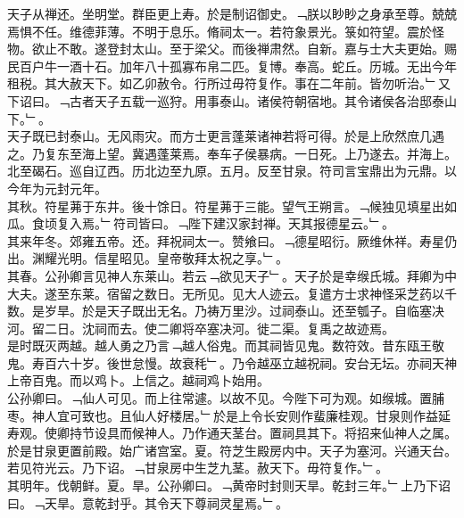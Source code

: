 \documentclass{zhvt-classic}
\begin{document}
\hspace*{2em}天子从禅还。坐明堂。群臣更上寿。於是制诏御史。﹁朕以眇眇之身承至尊。兢兢焉惧不任。维德菲薄。不明于息乐。脩祠太一。若符象景光。箓如符望。震於怪物。欲止不敢。遂登封太山。至于梁父。而後禅肃然。自新。嘉与士大夫更始。赐民百户牛一酒十石。加年八十孤寡布帛二匹。复博。奉高。蛇丘。历城。无出今年租税。其大赦天下。如乙卯赦令。行所过毋符复作。事在二年前。皆勿听治。﹂又下诏曰。﹁古者天子五载一巡狩。用事泰山。诸侯符朝宿地。其令诸侯各治邸泰山下。﹂。\\
\hspace*{2em}天子既已封泰山。无风雨灾。而方士更言蓬莱诸神若将可得。於是上欣然庶几遇之。乃复东至海上望。冀遇蓬莱焉。奉车子侯暴病。一日死。上乃遂去。并海上。北至碣石。巡自辽西。历北边至九原。五月。反至甘泉。符司言宝鼎出为元鼎。以今年为元封元年。\\
\hspace*{2em}其秋。符星茀于东井。後十馀日。符星茀于三能。望气王朔言。﹁候独见填星出如瓜。食顷复入焉。﹂符司皆曰。﹁陛下建汉家封禅。天其报德星云。﹂。\\
\hspace*{2em}其来年冬。郊雍五帝。还。拜祝祠太一。赞飨曰。﹁德星昭衍。厥维休祥。寿星仍出。渊耀光明。信星昭见。皇帝敬拜太祝之享。﹂。\\
\hspace*{2em}其春。公孙卿言见神人东莱山。若云﹁欲见天子﹂。天子於是幸缑氏城。拜卿为中大夫。遂至东莱。宿留之数日。无所见。见大人迹云。复遣方士求神怪采芝药以千数。是岁旱。於是天子既出无名。乃祷万里沙。过祠泰山。还至瓠子。自临塞决河。留二日。沈祠而去。使二卿将卒塞决河。徙二渠。复禹之故迹焉。\\
\hspace*{2em}是时既灭两越。越人勇之乃言﹁越人俗鬼。而其祠皆见鬼。数符效。昔东瓯王敬鬼。寿百六十岁。後世怠慢。故衰秏﹂。乃令越巫立越祝祠。安台无坛。亦祠天神上帝百鬼。而以鸡卜。上信之。越祠鸡卜始用。\\
\hspace*{2em}公孙卿曰。﹁仙人可见。而上往常遽。以故不见。今陛下可为观。如缑城。置脯枣。神人宜可致也。且仙人好楼居。﹂於是上令长安则作蜚廉桂观。甘泉则作益延寿观。使卿持节设具而候神人。乃作通天茎台。置祠具其下。将招来仙神人之属。於是甘泉更置前殿。始广诸宫室。夏。符芝生殿房内中。天子为塞河。兴通天台。若见符光云。乃下诏。﹁甘泉房中生芝九茎。赦天下。毋符复作。﹂。\\
\hspace*{2em}其明年。伐朝鲜。夏。旱。公孙卿曰。﹁黄帝时封则天旱。乾封三年。﹂上乃下诏曰。﹁天旱。意乾封乎。其令天下尊祠灵星焉。﹂。\\
\end{document}
